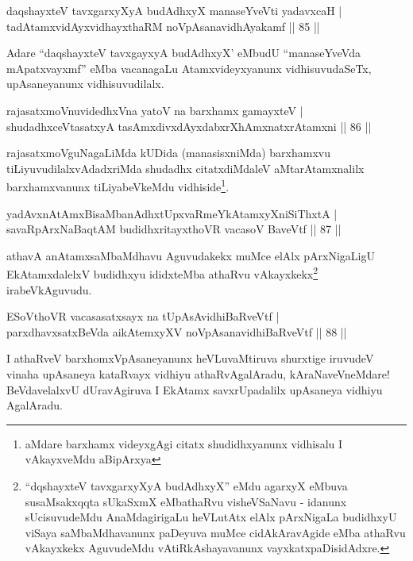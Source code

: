 \begin{shl}
daqshayxteV tavxgarxyXyA budAdhxyX manaseYveVti yadavxcaH |\\
tadAtamxvidAyxvidhayxthaRM noVpAsanavidhAyakamf \hfill || 85 ||
\end{shl}

\begin{artha}
Adare ``daqshayxteV tavxgayxyA budAdhxyX' eMbudU ``manaseYveVda mApatxvayxmf'' eMba vacanagaLu Atamxvideyxyanunx vidhisuvudaSeTx, upAsaneyanunx vidhisuvudilalx.
\end{artha}

\begin{shl}
rajasatxmoVnuvidedhxVna yatoV na barxhamx gamayxteV |\\
shudadhxceVtasatxyA tasAmxdivxdAyxdabxrXhAmxnatxrAtamxni \hfill || 86 ||
\end{shl}

\begin{artha}
rajasatxmoVguNagaLiMda kUDida (manasisxniMda) barxhamxvu tiLiyuvudilalxvAdadxriMda shudadhx citatxdiMdaleV aMtarAtamxnalilx barxhamxvanunx tiLiyabeVkeMdu  vidhiside\footnote[1]{aMdare barxhamx   videyxgAgi citatx shudidhxyanunx vidhisalu I vAkayxveMdu aBipArxya}.
\end{artha}

\begin{shl}
yadAvx\s nAtAmxBisaMbanAdhxtUpxvaRmeYkAtamxyXniSiThxtA |\\
savaRpArxNaBaqtAM budidhxritayxthoVR vacasoV BaveVtf \hfill || 87 ||
\end{shl}

\begin{artha}
athavA anAtamxsaMbaMdhavu Aguvudakekx muMce elAlx pArxNigaLigU
\-EkAtamxdalelxV budidhxyu ididxteMba athaRvu
vAkayxkekx\footnote[2]{``dqshayxteV tavxgarxyXyA budAdhxyX'' eMdu agarxyX eMbuva susaMsakxqqta
  sUkaSxmX eMbathaRvu visheVSaNavu - idanunx sUcisuvudeMdu
  AnaMdagirigaLu heVLutAtx elAlx pArxNigaLa budidhxyU viSaya
  saMbaMdhavanunx paDeyuva muMce cidAkAravAgide eMba athaRvu
  vAkayxkekx AguvudeMdu vAtiRkAshayavanunx vayxkatxpaDisidAdxre.} irabeVkAguvudu.
\end{artha}

\begin{shl}
ESoV\s thoVR vacasasatxsayx na tUpAsAvidhiBaRveVtf |\\
parxdhavxsatxBeVda aikAtemxyXV noVpAsanavidhiBaRveVtf \hfill || 88 ||
\end{shl}

\begin{artha}
I athaRveV barxhomxVpAsaneyanunx heVLuvaMtiruva shurxtige iruvudeV vinaha upAsaneya kataRvayx vidhiyu athaRvAgalAradu, kAraNaveVneMdare! BeVdavelalxvU dUravAgiruva I EkAtamx savxrUpadalilx upAsaneya vidhiyu AgalAradu.
\end{artha}


